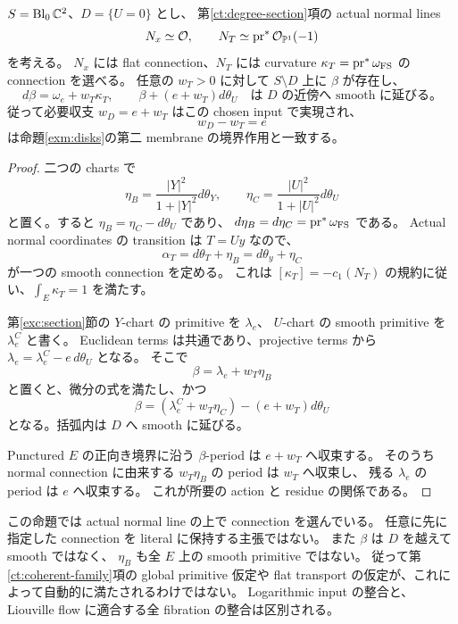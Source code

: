\begin{proposition}
\label{exm:log-input}
$S=\operatorname{Bl}_0\mathbb C^2$、$D=\{U=0\}$ とし、
第\ref{ct:degree-section}項の actual normal lines
\[
 N_x\simeq\mathcal O,
 \qquad N_T\simeq\operatorname{pr}^*\mathcal O_{\mathbb P^1}(-1)
\]
を考える。
$N_x$ には flat connection、$N_T$ には curvature
$\kappa_T=\operatorname{pr}^*\omega_{\rm FS}$ の connection を選べる。
任意の $w_T>0$ に対して $S\setminus D$ 上に $\beta$ が存在し、
\[
 d\beta=\omega_e+w_T\kappa_T,
 \qquad
 \beta+(e+w_T)d\theta_U
 \quad\text{は $D$ の近傍へ smooth に延びる。}
\]
従って必要収支 $w_D=e+w_T$ はこの chosen input で実現され、
\[
 w_D-w_T=e
\]
は命題\ref{exm:disks}の第二 membrane の境界作用と一致する。
\end{proposition}

\begin{proof}
二つの charts で
\[
 \eta_B=\frac{|Y|^2}{1+|Y|^2}d\theta_Y,
 \qquad
 \eta_C=\frac{|U|^2}{1+|U|^2}d\theta_U
\]
と置く。すると $\eta_B=\eta_C-d\theta_U$ であり、
$d\eta_B=d\eta_C=\operatorname{pr}^*\omega_{\rm FS}$ である。
Actual normal coordinates の transition は $T=Uy$ なので、
\[
 \alpha_T=d\theta_T+\eta_B=d\theta_y+\eta_C
\]
が一つの smooth connection を定める。
これは $[\kappa_T]=-c_1(N_T)$ の規約に従い、$\int_E\kappa_T=1$ を満たす。

第\ref{exc:section}節の $Y$-chart の primitive を $\lambda_e$、
$U$-chart の smooth primitive を $\lambda_e^C$ と書く。
Euclidean terms は共通であり、projective terms から
$\lambda_e=\lambda_e^C-e\,d\theta_U$ となる。
そこで
\[
 \beta=\lambda_e+w_T\eta_B
\]
と置くと、微分の式を満たし、かつ
\[
 \beta=(\lambda_e^C+w_T\eta_C)-(e+w_T)d\theta_U
\]
となる。括弧内は $D$ へ smooth に延びる。

Punctured $E$ の正向き境界に沿う $\beta$-period は $e+w_T$ へ収束する。
そのうち normal connection に由来する $w_T\eta_B$ の period は $w_T$ へ収束し、
残る $\lambda_e$ の period は $e$ へ収束する。
これが所要の action と residue の関係である。
\end{proof}

この命題では actual normal line の上で connection を選んでいる。
任意に先に指定した connection を literal に保持する主張ではない。
また $\beta$ は $D$ を越えて smooth ではなく、
$\eta_B$ も全 $E$ 上の smooth primitive ではない。
従って第\ref{ct:coherent-family}項の global primitive 仮定や
flat transport の仮定が、これによって自動的に満たされるわけではない。
Logarithmic input の整合と、Liouville flow に適合する全 fibration の整合は区別される。

